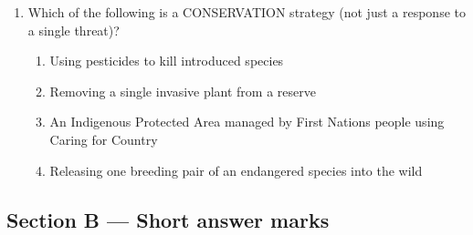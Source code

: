 \documentclass[11pt,a4paper]{article}
\begin{document}
\begin{enumerate}[label=\textbf{\arabic*.}, itemsep=10pt]
\item Which of the following is a CONSERVATION strategy (not just a response to a single threat)?
\begin{enumerate}[label=\Alph*., itemsep=2pt]
  \item Using pesticides to kill introduced species
  \item Removing a single invasive plant from a reserve
  \item An Indigenous Protected Area managed by First Nations people using Caring for Country
  \item Releasing one breeding pair of an endangered species into the wild
\end{enumerate}

\end{enumerate}

\newpage

\subsection*{Section B --- Short answer \hfill \small{} marks}
\end{document}
